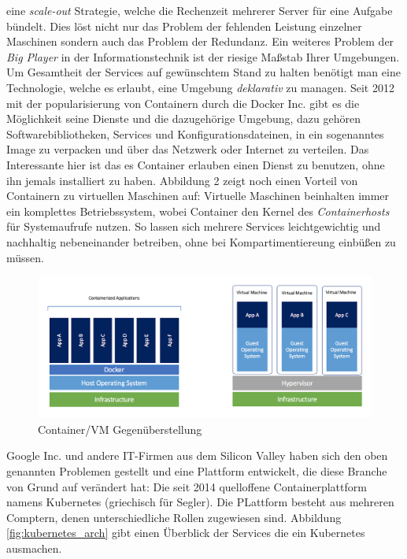 \documentclass[a4paper,11pt]{article}
\begin{document}
      eine \textit{scale-out} Strategie, welche die Rechenzeit mehrerer Server für eine Aufgabe bündelt. Dies löst nicht nur das Problem der 
      fehlenden Leistung einzelner Maschinen sondern auch das Problem der Redundanz. Ein weiteres Problem der \emph{Big Player} in der Informationstechnik
      ist der riesige Maßstab Ihrer Umgebungen. Um Gesamtheit der Services auf gewünschtem Stand zu halten benötigt man eine Technologie, welche es erlaubt,
      eine Umgebung \emph{deklarativ} zu managen. Seit 2012 mit der popularisierung von Containern durch die Docker Inc. gibt es die Möglichkeit seine
      Dienste und die dazugehörige Umgebung, dazu gehören Softwarebibliotheken, Services und Konfigurationsdateinen, in ein sogenanntes Image zu
      verpacken und über das Netzwerk oder Internet zu verteilen. Das Interessante hier ist das es Container erlauben einen Dienst zu benutzen, ohne ihn 
      jemals installiert zu haben. Abbildung 2 zeigt noch einen Vorteil von Containern zu virtuellen Maschinen auf:\newline
      Virtuelle Maschinen beinhalten immer ein komplettes Betriebssystem, wobei Container den Kernel des \emph{Containerhosts} für Systemaufrufe nutzen.
      So lassen sich mehrere Services leichtgewichtig und nachhaltig nebeneinander betreiben, ohne bei Kompartimentiereung einbüßen zu müssen.  
      \begin{figure}[!ht]
        \includegraphics[width=\linewidth]{assets/containers-vm.jpg}
        \caption{Container/VM Gegenüberstellung}
        \label{fig:container_vm}
      \end{figure}
      Google Inc. und andere IT-Firmen aus dem Silicon Valley haben sich den oben genannten Problemen gestellt und
      eine Plattform entwickelt, die diese Branche von Grund auf verändert hat: Die seit 2014 quelloffene 
      Containerplattform namens Kubernetes (griechisch für Segler). Die PLattform besteht aus mehreren Comptern, denen unterschiedliche
      Rollen zugewiesen sind. Abbildung \ref{fig:kubernetes_arch} gibt einen Überblick der Services die ein Kubernetes ausmachen.
\end{document}
